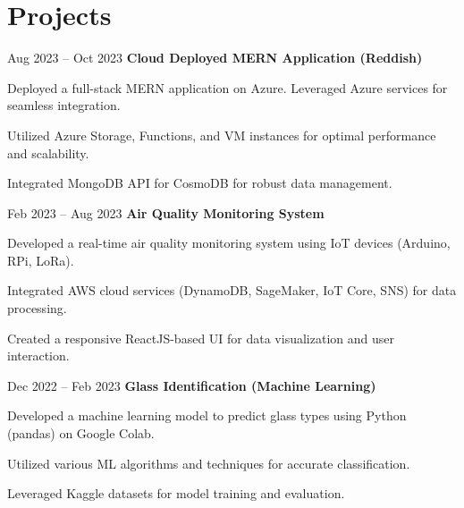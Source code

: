 \section{Projects}
\begin{twocolentry}{
        Aug 2023 -- Oct 2023
    }
        \textbf{Cloud Deployed MERN Application (Reddish)}\end{twocolentry}
    \vspace{0.10 cm}
    \begin{onecolentry}
        \begin{highlights}
            \item Deployed a full-stack MERN application on Azure.  Leveraged Azure services for seamless integration.
            \item Utilized Azure Storage, Functions, and VM instances for optimal performance and scalability.
            \item Integrated MongoDB API for CosmoDB for robust data management.
        \end{highlights}
    \end{onecolentry}
\vspace{0.2 cm}
\begin{twocolentry}{
        Feb 2023 -- Aug 2023
    }
        \textbf{Air Quality Monitoring System}\end{twocolentry}
    \vspace{0.10 cm}
    \begin{onecolentry}
        \begin{highlights}
            \item Developed a real-time air quality monitoring system using IoT devices (Arduino, RPi, LoRa).
            \item Integrated AWS cloud services (DynamoDB, SageMaker, IoT Core, SNS) for data processing.
            \item Created a responsive ReactJS-based UI for data visualization and user interaction.
        \end{highlights}
    \end{onecolentry}
\vspace{0.2 cm}
\begin{twocolentry}{
        Dec 2022 -- Feb 2023
    }
        \textbf{Glass Identification (Machine Learning)}\end{twocolentry}
    \vspace{0.10 cm}
    \begin{onecolentry}
        \begin{highlights}
            \item Developed a machine learning model to predict glass types using Python (pandas) on Google Colab.
            \item Utilized various ML algorithms and techniques for accurate classification.
            \item Leveraged Kaggle datasets for model training and evaluation.
        \end{highlights}
    \end{onecolentry}
